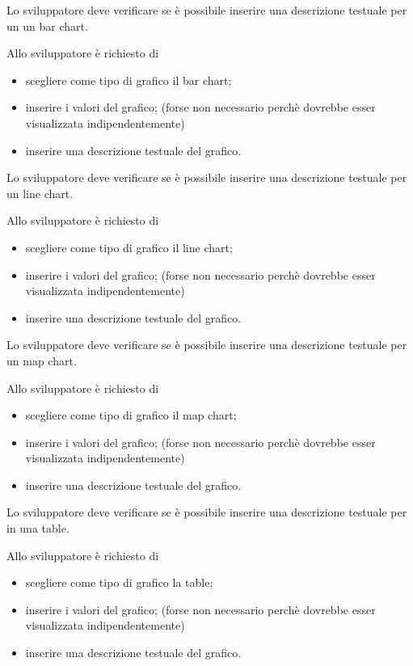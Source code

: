 	Lo sviluppatore deve verificare se è possibile inserire una descrizione testuale per un un bar chart.

		Allo sviluppatore è richiesto di
		\begin{itemize}
			\item scegliere come tipo di grafico il bar chart;
			\item inserire i valori del grafico; (forse non necessario perchè dovrebbe esser visualizzata indipendentemente)
			\item inserire una descrizione testuale del grafico.
		\end{itemize}

	Lo sviluppatore deve verificare se è possibile inserire una descrizione testuale per un line chart.

		Allo sviluppatore è richiesto di
		\begin{itemize}
			\item scegliere come tipo di grafico il line chart;
			\item inserire i valori del grafico; (forse non necessario perchè dovrebbe esser visualizzata indipendentemente)
			\item inserire una descrizione testuale del grafico.
		\end{itemize}

	Lo sviluppatore deve verificare se è possibile inserire una descrizione testuale per un map chart.

		Allo sviluppatore è richiesto di
		\begin{itemize}
			\item scegliere come tipo di grafico il map chart;
			\item inserire i valori del grafico; (forse non necessario perchè dovrebbe esser visualizzata indipendentemente)
			\item inserire una descrizione testuale del grafico.
		\end{itemize}

	Lo sviluppatore deve verificare se è possibile inserire una descrizione testuale per in una table.

		Allo sviluppatore è richiesto di
		\begin{itemize}
			\item scegliere come tipo di grafico la table;
			\item inserire i valori del grafico; (forse non necessario perchè dovrebbe esser visualizzata indipendentemente)
			\item inserire una descrizione testuale del grafico.
		\end{itemize}

